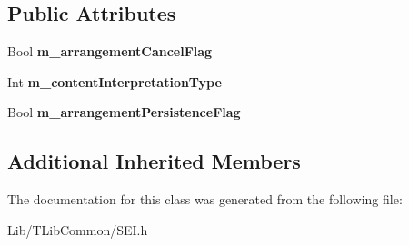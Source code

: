 \subsection*{Public Attributes}
\begin{DoxyCompactItemize}
\item 
\mbox{\label{class_s_e_i_segmented_rect_frame_packing_ac7eedd92d36abb0ead512bea53a72745}} 
Bool {\bfseries m\+\_\+arrangement\+Cancel\+Flag}
\item 
\mbox{\label{class_s_e_i_segmented_rect_frame_packing_ad6a77806d138ad1b1a51c4b6c964c781}} 
Int {\bfseries m\+\_\+content\+Interpretation\+Type}
\item 
\mbox{\label{class_s_e_i_segmented_rect_frame_packing_a82d1a4fa71a7b0c7ec1837b6b39c4f9c}} 
Bool {\bfseries m\+\_\+arrangement\+Persistence\+Flag}
\end{DoxyCompactItemize}
\subsection*{Additional Inherited Members}


The documentation for this class was generated from the following file\+:\begin{DoxyCompactItemize}
\item 
Lib/\+T\+Lib\+Common/S\+E\+I.\+h\end{DoxyCompactItemize}
